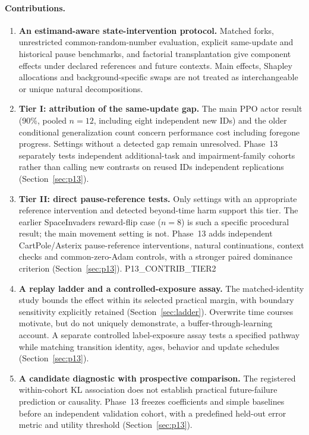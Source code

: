 \documentclass[10pt]{article} %
\begin{document}
\paragraph{Contributions.}
\begin{enumerate}[leftmargin=*]
\item \textbf{An estimand-aware state-intervention protocol.} Matched forks, unrestricted common-random-number evaluation, explicit same-update and historical pause benchmarks, and factorial transplantation give component effects under declared references and future contexts. Main effects, Shapley allocations and background-specific swaps are not treated as interchangeable or unique natural decompositions.
\item \textbf{Tier I: attribution of the same-update gap.} The main PPO actor result (90\%, pooled $n=12$, including eight independent new IDs) and the older conditional generalization count concern performance cost including foregone progress. Settings without a detected gap remain unresolved. Phase~13 separately tests independent additional-task and impairment-family cohorts rather than calling new contrasts on reused IDs independent replications (Section~\ref{sec:p13}).
\item \textbf{Tier II: direct pause-reference tests.} Only settings with an appropriate reference intervention and detected beyond-time harm support this tier. The earlier SpaceInvaders reward-flip case ($n=8$) is such a specific procedural result; the main movement setting is not. Phase~13 adds independent CartPole/Asterix pause-reference interventions, natural continuations, context checks and common-zero-Adam controls, with a stronger paired dominance criterion (Section~\ref{sec:p13}). P13_CONTRIB_TIER2
\item \textbf{A replay ladder and a controlled-exposure assay.} The matched-identity study bounds the effect within its selected practical margin, with boundary sensitivity explicitly retained (Section~\ref{sec:ladder}). Overwrite time courses motivate, but do not uniquely demonstrate, a buffer-through-learning account. A separate controlled label-exposure assay tests a specified pathway while matching transition identity, ages, behavior and update schedules (Section~\ref{sec:p13}).
\item \textbf{A candidate diagnostic with prospective comparison.} The registered within-cohort KL association does not establish practical future-failure prediction or causality. Phase~13 freezes coefficients and simple baselines before an independent validation cohort, with a predefined held-out error metric and utility threshold (Section~\ref{sec:p13}).
\end{enumerate}
\end{document}
